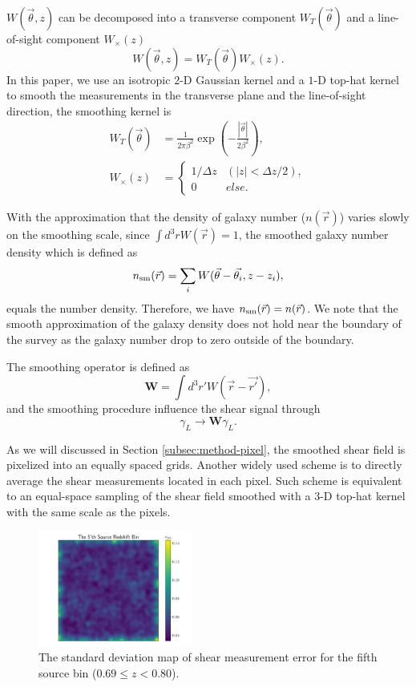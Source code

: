 \documentclass[twocolumn]{aastex62}
\begin{document}
$W(\vec{\theta},z)$ can be decomposed into a transverse component $W_T(\vec{\theta})$ and a line-of-sight component
$W_\times(z)$
\begin{equation}
W(\vec{\theta},z)=W_T(\vec{\theta}) W_\times (z).
\end{equation}
In this paper, we use an isotropic $2$-D Gaussian kernel and a $1$-D top-hat kernel to smooth the measurements in the 
transverse plane and the line-of-sight direction, the smoothing kernel is 
\begin{equation}
\begin{split}
W_T(\vec{\theta}) &=\frac{1}{2\pi\beta^2}\exp(-\frac{|\vec{\theta}|}{2\beta^2}),\\
W_\times (z) &=
\begin{cases}
1/\Delta z& (|z|<\Delta z/2),\\
0& else.
\end{cases}
\end{split}
\end{equation}

With the approximation that the density of galaxy number ($n(\vec{r})$) varies slowly on the smoothing scale, 
since $\int d^3r W(\vec{r})=1$, the smoothed galaxy number density which is defined as
$$n_{\rm{sm}}(\vec{r})=\sum_i W(\vec{\theta}-\vec{\theta_i},z-z_i),$$
equals the number density. Therefore, we have $n_{\rm{sm}}(\vec{r})=n(\vec{r})$.
We note that the smooth approximation of the galaxy density does not hold near the boundary of the survey as
the galaxy number drop to zero outside of the boundary.

The smoothing operator is defined as
\begin{equation}
\mathbf{W} = \int d^3 r' W(\vec{r}-\vec{r'}),
\end{equation}
and the smoothing procedure influence the shear signal through
\begin{equation}
\gamma_L \rightarrow \mathbf{W} \gamma_L.
\end{equation}

As we will discussed in Section \ref{subsec:method-pixel}, the smoothed shear field is pixelized into an equally spaced
grids. Another widely used scheme is to directly average the shear measurements located in each pixel. Such scheme is 
equivalent to an equal-space sampling of the shear field smoothed with a $3$-D top-hat kernel with the same scale as 
the pixels.


\begin{figure}[!t]
 \centering
 \includegraphics[width=0.45\textwidth]{noise_std_map_pix.pdf}
 \caption{The standard deviation map of shear measurement error for the fifth source bin ($0.69 \leq z < 0.80 $).}
\end{figure}
\end{document}
